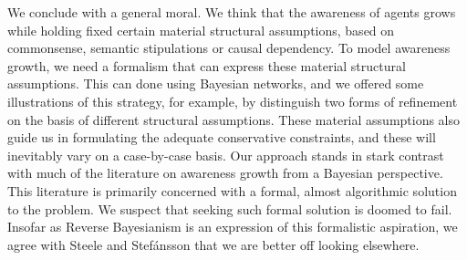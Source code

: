 \documentclass[
  11pt,
  dvipsnames,enabledeprecatedfontcommands]{scrartcl}
\begin{document}
We conclude with a general moral. We think that the awareness of agents
grows while holding fixed certain material structural assumptions, based
on commonsense, semantic stipulations or causal dependency. To model
awareness growth, we need a formalism that can express these material
structural assumptions. This can done using Bayesian networks, and we
offered some illustrations of this strategy, for example, by distinguish
two forms of refinement on the basis of different structural
assumptions. These material assumptions also guide us in formulating the
adequate conservative constraints, and these will inevitably vary on a
case-by-case basis. Our approach stands in stark contrast with much of
the literature on awareness growth from a Bayesian perspective. This
literature is primarily concerned with a formal, almost algorithmic
solution to the problem. We suspect that seeking such formal solution is
doomed to fail. Insofar as Reverse Bayesianism is an expression of this
formalistic aspiration, we agree with Steele and Stefánsson that we are
better off looking elsewhere.
\end{document}
